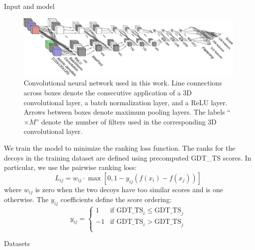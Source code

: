 \documentclass[final, unknownkeysallowed]{beamer}
\begin{document}
\begin{frame}{}
\begin{textblock}{39.0}
\begin{block}{Input and model}
\begin{figure}[H]
    \centering
    \includegraphics[width=\linewidth]{../draft/Fig/ConvnetDiagramV1.png}
    \captionsetup{width=0.8\linewidth}
    \caption{Convolutional neural network used in this work. Line
      connections across boxes denote the consecutive application of a
      3D convolutional layer, a batch normalization layer, and a ReLU
      layer. Arrows between boxes denote maximum pooling layers. The
      labels ``$\times M$'' denote the number of filters used in the
      corresponding 3D convolutional layer.}
    \label{Fig:CNNModel}
\end{figure}

We train the model to minimize the ranking loss function.  The ranks
for the decoys in the training dataset are defined using precomputed
GDT\_TS scores.  In particular, we use the pairwise ranking loss:
$$
L_{ij} = w_{ij} \cdot \max \left[ 0, 1 - y_{ij} \left( f(x_i) - f(x_j) \right) \right]
$$
where $w_{ij}$ is zero when the two decoys have too similar scores and is one
otherwise.  The $y_{ij}$ coefficients define the score ordering:
$$
y_{ij} = \begin{cases}
                1& \text{if } \text{GDT\_TS}_i \leq \text{GDT\_TS}_j \\
               -1& \text{if } \text{GDT\_TS}_i > \text{GDT\_TS}_j \\
           \end{cases}
$$

\end{block}

\begin{block}{Datasets}


\end{block}
\end{textblock}
\end{frame}
\end{document}
